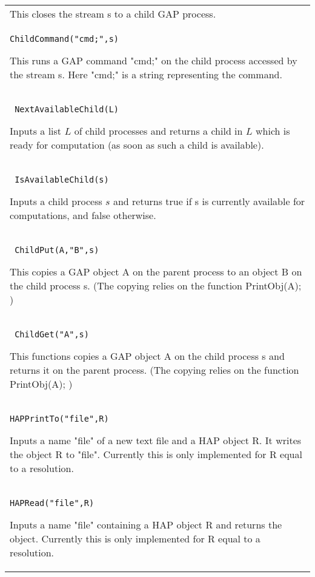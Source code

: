 \documentclass[a4paper,11pt]{report}
\begin{document}
{\begin{center}
\begin{tabular}{|l|}
 This closes the stream s to a child GAP process. \\
 \index{ChildCommand} \texttt{ChildCommand("cmd;",s)} 

 This runs a GAP command "cmd;" on the child process accessed by the stream s.
Here "cmd;" is a string representing the command. \\
 \index{NextAvailableChild} \texttt{ NextAvailableChild(L)} 

 Inputs a list $L$ of child processes and returns a child in $L$ which is ready for computation (as soon as such a child is available). \\
 \index{IsAvailableChild} \texttt{ IsAvailableChild(s)} 

 Inputs a child process $s$ and returns true if s is currently available for computations, and false
otherwise. \\
 \index{ChildPut} \texttt{ ChildPut(A,"B",s)} 

 This copies a GAP object A on the parent process to an object B on the child
process s. (The copying relies on the function PrintObj(A); ) \\
 \index{ChildGet} \texttt{ ChildGet("A",s)} 

 This functions copies a GAP object A on the child process s and returns it on
the parent process. (The copying relies on the function PrintObj(A); ) \\
 \index{HAPPrintTo} \texttt{HAPPrintTo("file",R)} 

 Inputs a name "file" of a new text file and a HAP object R. It writes the
object R to "file". Currently this is only implemented for R equal to a
resolution. \\
 \index{HAPRead} \texttt{HAPRead("file",R)} 

 Inputs a name "file" containing a HAP object R and returns the object.
Currently this is only implemented for R equal to a resolution. \\
\end{tabular}\\[2mm]
\end{center}

 }

 
\end{document}
